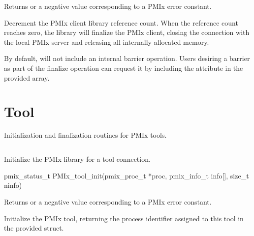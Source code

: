 Returns  or a negative value corresponding to a PMIx error constant.

\descr

Decrement the PMIx client library reference count.
When the reference count reaches zero, the library will finalize the PMIx client, closing the connection with the local PMIx server and releasing all internally allocated memory.

By default,  will not include an internal barrier operation.
Users desiring a barrier as part of the finalize operation can request it by including the  attribute in the provided  array.



\section{Tool}
\label{chap:api_init:tool}

Initialization and finalization routines for \ac{PMIx} tools.

\subsection{}

\summary

Initialize the \ac{PMIx} library for a tool connection.

\format

\cspecificstart
\begin{codepar}
pmix_status_t
PMIx_tool_init(pmix_proc_t *proc,
               pmix_info_t info[], size_t ninfo)
\end{codepar}
\cspecificend

\begin{arglist}
\end{arglist}

Returns  or a negative value corresponding to a PMIx error constant.

\descr

Initialize the PMIx tool, returning the process identifier assigned to this tool in the provided  struct.

